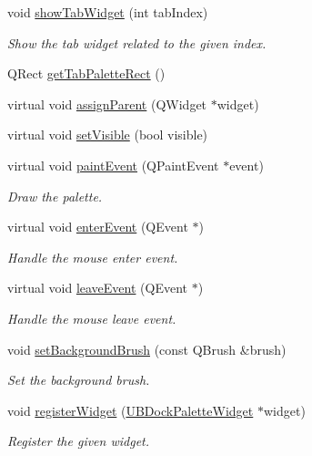 \begin{DoxyCompactItemize}
void \hyperlink{class_u_b_dock_palette_a52804f9500ef50532614925bb74e9c54}{show\-Tab\-Widget} (int tab\-Index)
\begin{DoxyCompactList}\small\item\em Show the tab widget related to the given index. \end{DoxyCompactList}\item 
Q\-Rect \hyperlink{class_u_b_dock_palette_a412f7f43387ba3a94c28df3d322b524b}{get\-Tab\-Palette\-Rect} ()
\item 
virtual void \hyperlink{class_u_b_dock_palette_a545ece47022926c33f4d85c74d07c9d9}{assign\-Parent} (Q\-Widget $\ast$widget)
\item 
virtual void \hyperlink{class_u_b_dock_palette_a2f0e89d9ac6050f816e95f1c2a42086b}{set\-Visible} (bool visible)
\item 
virtual void \hyperlink{class_u_b_dock_palette_ac5525838683550752c6271782798d996}{paint\-Event} (Q\-Paint\-Event $\ast$event)
\begin{DoxyCompactList}\small\item\em Draw the palette. \end{DoxyCompactList}\item 
virtual void \hyperlink{class_u_b_dock_palette_af4862e7ae417a82f310c0e194b65698b}{enter\-Event} (Q\-Event $\ast$)
\begin{DoxyCompactList}\small\item\em Handle the mouse enter event. \end{DoxyCompactList}\item 
virtual void \hyperlink{class_u_b_dock_palette_ac44a26c350498a3ac87057c6841542d0}{leave\-Event} (Q\-Event $\ast$)
\begin{DoxyCompactList}\small\item\em Handle the mouse leave event. \end{DoxyCompactList}\item 
void \hyperlink{class_u_b_dock_palette_ae07ab6fb4957bc20c14d128eb20d7c3f}{set\-Background\-Brush} (const Q\-Brush \&brush)
\begin{DoxyCompactList}\small\item\em Set the background brush. \end{DoxyCompactList}\item 
void \hyperlink{class_u_b_dock_palette_abdf971a95758e87ac531948a650a5e1f}{register\-Widget} (\hyperlink{class_u_b_dock_palette_widget}{U\-B\-Dock\-Palette\-Widget} $\ast$widget)
\begin{DoxyCompactList}\small\item\em Register the given widget. \end{DoxyCompactList}\item 

\end{DoxyCompactItemize}
